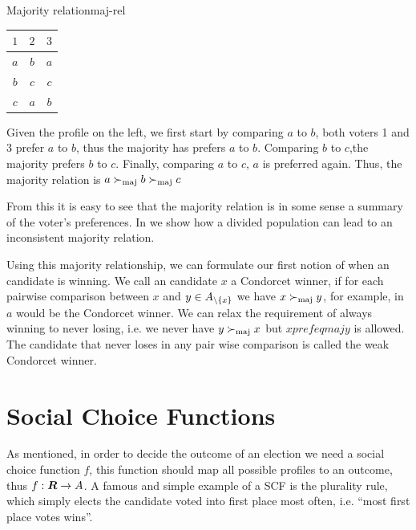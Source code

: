 \begin{example}{Majority relation}{maj-rel}
	\begin{minipage}{0.15\linewidth}
		\begin{tabular}{ccc}
			\toprule
			$1$ & $2$ & $3$ \\
			\midrule
			$a$ & $b$ & $a$ \\
			$b$ & $c$ & $c$ \\
			$c$ & $a$ & $b$ \\
			\bottomrule
		\end{tabular}
	\end{minipage}
	\hspace{0.02\linewidth}
	\begin{minipage}{0.78\linewidth}
		Given the profile on the left, we first start by comparing $a$ to $b$, both voters 1 and 3 prefer $a$ to $b$, thus the majority has prefers $a$ to $b$. Comparing $b$ to $c$,the majority prefers $b$ to $c$. Finally, comparing $a$ to $c$, $a$ is preferred again. Thus, the majority relation is $a \succ_{\textnormal{maj}} b \succ_{\textnormal{maj}} c$
	\end{minipage}
\end{example}

From this it is easy to see that the majority relation is in some sense a
summary of the voter's preferences. In 
we show how a divided population can lead to an inconsistent majority relation.

Using this majority relationship, we can formulate our first notion of when an
candidate is winning. We call an candidate $x$ a Condorcet winner, if for
each pairwise comparison between $x$ and $y \in A_{\setminus
		\{x\}}$ we have $x \succ_{\textnormal{maj}} y$, for example, in  $a$ would be
the Condorcet winner. We can relax the requirement of always winning to never
losing, i.e. we never have $y \succ_{\textnormal{maj}} x$ but $x prefeqmaj y$ is allowed. The
candidate that never loses in any pair wise comparison is called the weak
Condorcet winner.

\section{Social Choice Functions} \label{sec:SCF}

As mentioned, in order to decide the outcome of an election we need a social choice function
$f$, this function should map all possible profiles to an outcome, thus $f:
	\boldsymbol{R} \to A$. A famous and simple example of a SCF is the plurality
rule, which simply elects the candidate voted into first place most often, i.e. ``most first place votes wins''.

